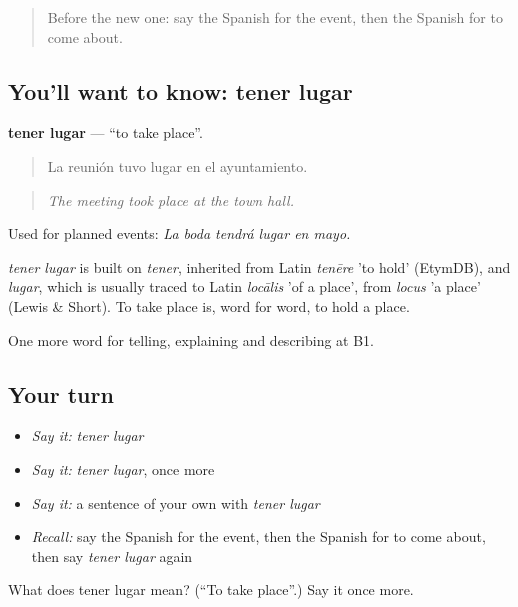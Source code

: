 \label{lesson:ES-C512-tener-lugar}



\begin{quote}
Before the new one: say the Spanish for the event, then the Spanish for to come about.
\end{quote}

\subsection*{You'll want to know: tener lugar}
\textbf{tener lugar} — \textquotedblleft{}to take place\textquotedblright{}.

\begin{quote}
La reunión tuvo lugar en el ayuntamiento.
\end{quote}

\begin{quote}
\emph{The meeting took place at the town hall.}
\end{quote}

Used for planned events: \emph{La boda tendrá lugar en mayo.}

\begin{cousinweb}
\emph{tener lugar} is built on \emph{tener}, inherited from Latin \emph{tenēre} 'to hold' (EtymDB), and \emph{lugar}, which is usually traced to Latin \emph{locālis} 'of a place', from \emph{locus} 'a place' (Lewis \& Short). To take place is, word for word, to hold a place.
\end{cousinweb}

\begin{grammarlens}[title={What you've built}]
One more word for telling, explaining and describing at B1.
\end{grammarlens}

\subsection*{Your turn}
\begin{itemize}
\raggedright
  \item \emph{Say it:} \emph{tener lugar}
  \item \emph{Say it:} \emph{tener lugar}, once more
  \item \emph{Say it:} a sentence of your own with \emph{tener lugar}
  \item \emph{Recall:} say the Spanish for the event, then the Spanish for to come about, then say \emph{tener lugar} again
\end{itemize}

\begin{tcolorbox}[breakable,colback=teal!4,colframe=teal!35!black,title={Before you move on}]
What does tener lugar mean? (\textquotedblleft{}To take place\textquotedblright{}.) Say it once more.
\end{tcolorbox}
